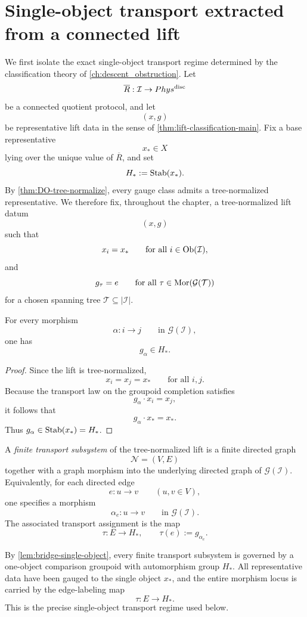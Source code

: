 \section{Single-object transport extracted from a connected lift}
We first isolate the exact single-object transport regime determined by the
classification theory of \cref{ch:descent_obstruction}.
Let
\[
	\overline R:\mathcal I\to Phys^{\mathrm{disc}}
\]
be a connected quotient protocol, and let
\[
	(x,g)
\]
be representative lift data in the sense of
\cref{thm:lift-classification-main}. Fix a base representative
\[
	x_*\in X
\]
lying over the unique value of \(\overline R\), and set
\[
	H_*:=\operatorname{Stab}(x_*).
\]
By \cref{thm:DO-tree-normalize}, every gauge class admits a
tree-normalized representative. We therefore fix, throughout the
chapter, a tree-normalized lift datum
\[
	(x,g)
\]
such that
\[
	x_i=x_*
	\qquad
	\text{for all }i\in \operatorname{Ob}(\mathcal I),
\]
and
\[
	g_\tau=e
	\qquad
	\text{for all }\tau\in \mathrm{Mor}(\mathcal G(\mathcal T))
\]
for a chosen spanning tree \(\mathcal T\subseteq |\mathcal I|\).
\begin{lemma}
	\label{lem:bridge-single-object}
	For every morphism
	\[
		\alpha:i\to j
		\qquad
		\text{in }\mathcal G(\mathcal I),
	\]
	one has
	\[
		g_\alpha\in H_*.
	\]
\end{lemma}
\begin{proof}
	Since the lift is tree-normalized,
	\[
		x_i=x_j=x_*
		\qquad
		\text{for all }i,j.
	\]
	Because the transport law on the groupoid completion satisfies
	\[
		g_\alpha\cdot x_i=x_j,
	\]
	it follows that
	\[
		g_\alpha\cdot x_*=x_*.
	\]
	Thus \(g_\alpha\in \operatorname{Stab}(x_*)=H_*\).
\end{proof}
\begin{definition}
	A \emph{finite transport subsystem} of the tree-normalized lift is a
	finite directed graph
	\[
		\mathcal N=(V,E)
	\]
	together with a graph morphism into the underlying directed graph of
	\(\mathcal G(\mathcal I)\). Equivalently, for each directed edge
	\[
		e:u\to v
		\qquad
		(u,v\in V),
	\]
	one specifies a morphism
	\[
		\alpha_e:u\to v
		\qquad
		\text{in }\mathcal G(\mathcal I).
	\]
	The associated transport assignment is the map
	\[
		\tau:E\to H_*,
		\qquad
		\tau(e):=g_{\alpha_e}.
	\]
\end{definition}
\begin{remark}
	By \cref{lem:bridge-single-object}, every finite transport subsystem is
	governed by a one-object comparison groupoid with automorphism group
	\(H_*\). All representative data have been gauged to the single object
	\(x_*\), and the entire morphism locus is carried by the edge-labeling
	map
	\[
		\tau:E\to H_*.
	\]
	This is the precise single-object transport regime used below.
\end{remark}
